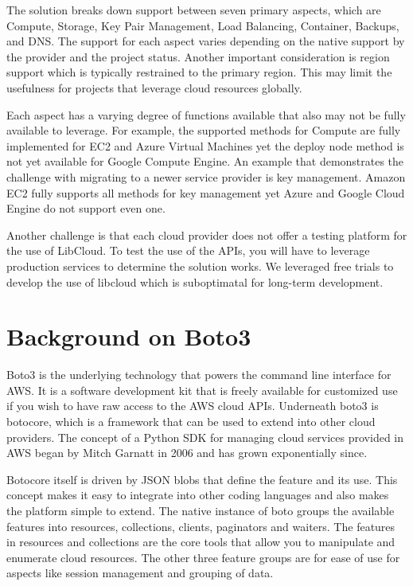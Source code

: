 The solution breaks down support between seven primary aspects, which are
Compute, Storage, Key Pair Management, Load Balancing, Container, Backups, and
DNS. The support for each aspect varies depending on the native support by the
provider and the project status. Another important consideration is region
support which is typically restrained to the primary region. This may limit the
usefulness for projects that leverage cloud resources globally.

Each aspect has a varying degree of functions available that also may not be
fully available to leverage. For example, the supported methods for Compute are
fully implemented for EC2 and Azure Virtual Machines yet the deploy node method
is not yet available for Google Compute Engine. An example that demonstrates the
challenge with migrating to a newer service provider is key management. Amazon
EC2 fully supports all methods for key management yet Azure and Google Cloud
Engine do not support even one.

Another challenge is that each cloud provider does not offer a testing platform
for the use of LibCloud. To test the use of the APIs, you will have to leverage
production services to determine the solution works. We leveraged free trials to
develop the use of libcloud which is suboptimatal for long-term development.

\section{Background on Boto3}

Boto3 is the underlying technology that powers the command line interface for
AWS. It is a software development kit that is freely available for customized
use if you wish to have raw access to the AWS cloud APIs. Underneath boto3 is
botocore, which is a framework that can be used to extend into other cloud
providers. The concept of a Python SDK for managing cloud services provided in
AWS began by Mitch Garnatt in 2006 and has grown exponentially
since.~\cite{hid-sp18-518-AWS-boto3}

Botocore itself is driven by JSON blobs that define the feature and its use.
This concept makes it easy to integrate into other coding languages and also
makes the platform simple to extend. The native instance of boto groups the
available features into resources, collections, clients, paginators and waiters.
The features in resources and collections are the core tools that allow you to
manipulate and enumerate cloud resources. The other three feature groups are for
ease of use for aspects like session management and grouping of
data.~\cite{hid-sp18-518-Boto3}

